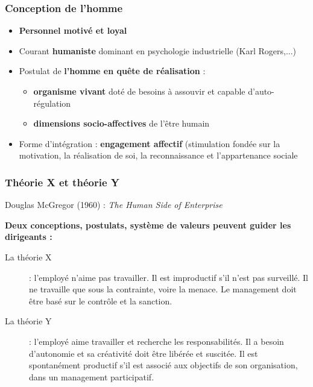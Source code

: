 \documentclass[12pt]{beamer}
\begin{document}
  \begin{frame}
    \frametitle{Conception de l'homme}
    \begin{itemize}
     \item \textbf{Personnel motivé et loyal}
     \item Courant \textbf{humaniste} dominant en psychologie industrielle (Karl Rogers,...)
     \item Postulat de \textbf{l'homme en quête de réalisation} :
	\begin{itemize}
	 \item \textbf{organisme vivant} doté de besoins à assouvir et capable d'auto-régulation
	 \item \textbf{dimensions socio-affectives} de l'être humain
	\end{itemize}
    \item Forme d'intégration : \textbf{engagement affectif} (stimulation fondée sur la motivation, la réalisation de soi, la reconnaissance et l'appartenance sociale

    \end{itemize}
  \end{frame}
  
  \begin{frame}
    \frametitle{Théorie X et théorie Y}
    
    Douglas McGregor (1960) : \textit{The Human Side of Enterprise} \bigskip
    
    \textbf{Deux conceptions, postulats, système de valeurs peuvent guider les dirigeants : }
    
    \begin{description}
     \item[La théorie X] : l'employé n'aime pas travailler. Il est improductif s'il n'est pas surveillé. Il ne travaille que sous la contrainte, voire la menace. Le management doit être basé sur le contrôle et la sanction.
     \item[La théorie Y] : l'employé aime travailler et recherche les responsabilités. Il a besoin d'autonomie et sa créativité doit être libérée et suscitée. Il est spontanément productif s'il est associé aux objectifs de son organisation, dans un management participatif.
    \end{description}
    
  \end{frame}
  
\end{document}
